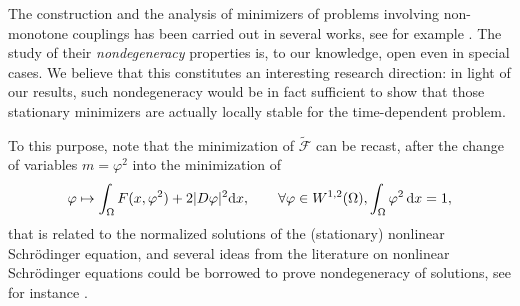 \documentclass[10pt,a4paper,nouppercase,nowrite]{article}
\numberwithin{equation}{section}
\newcommand{\di}{{\rm d}}
\newcommand{\F}{\widetilde{\mathcal{F}}}
\theoremstyle{definition}
\begin{document}
The construction and the analysis of minimizers of problems involving non-monotone couplings has been carried out in several works, see for example \cite{CCCon, CVe, CKWZ, KTZ, KTZZ, MS18}. The study of their \textit{nondegeneracy} properties is, to our knowledge, open even in special cases. We believe that this constitutes an interesting research direction: in light of our results, such nondegeneracy would be in fact sufficient to show that those stationary minimizers are actually locally stable for the time-dependent problem.

To this purpose, note that the minimization of $\F$ can be recast, after the change of variables $m=\varphi^2$ into the minimization of
\[
\varphi \mapsto \int_{\Omega} F(x,\varphi^2) + 2 |D\varphi|^2 \di x, \qquad \forall \varphi \in W^{1,2}(\Omega), \int_{\Omega} \varphi^2 \, \di x=1,
\]
that is related to the normalized solutions of the (stationary) nonlinear Schr\"odinger equation, and several ideas from the literature on nonlinear Schr\"odinger equations could be borrowed to prove nondegeneracy of solutions, see for instance \cite{PPVV, W99}.
\end{document}
